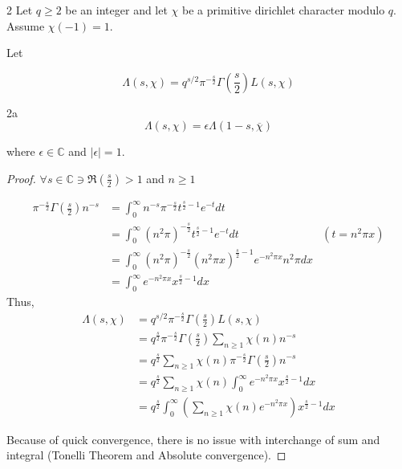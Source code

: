 \documentclass{article}
\newcommand{\C}{\mathbb{C}}
\newcommand{\abs}[1]{\left\lvert #1\right\rvert}
\begin{document}
\bigskip

\begin{PROB}{2}\label{Problem 2.}
    Let $q \geq 2$ be an integer and let $\chi$ be a primitive dirichlet character modulo $q$. Assume $\chi(-1) = 1$. 
    
    Let 

    \[\Lambda(s, \chi) = q^{s / 2} \pi^{-\frac{s}{2}}\Gamma\left(\frac{s}{2}\right)L(s, \chi)\]
\end{PROB}
\begin{claim}{2a}\label{Claim 2a.}
    \[\Lambda(s, \chi) = \epsilon \Lambda(1 - s, \overline{\chi})\]
    
    where $\epsilon \in \C$ and $\abs{\epsilon} = 1$.    
\end{claim}
\begin{proof}
    $\forall s \in \C \ni \Re(\frac{s}{2}) > 1$ and $n \geq 1$
    
    \begin{align*}
        \pi^{-\frac{s}{2}} \Gamma\left(\frac{s}{2}\right) n^{-s} &= \int_{0}^{\infty} n^{-s}\pi^{-\frac{s}{2}} t^{\frac{s}{2} - 1}e^{-t} dt \\
        &= \int_{0}^{\infty} (n^2 \pi)^{-\frac{s}{2}} t^{\frac{s}{2} - 1}e^{-t} dt & (t = n^2 \pi x) \\
        &= \int_0^{\infty} (n^2 \pi)^{-\frac{s}{2}} (n^2 \pi x)^{\frac{s}{2} - 1} e^{-n^2 \pi x} n^2 \pi dx \\
        &= \int_{0}^{\infty} e^{-n^2 \pi x} x^{\frac{s}{2} - 1} dx
    \end{align*}
    Thus, 
    \begin{align*}
        \Lambda(s, \chi) &= q^{s / 2} \pi^{-\frac{s}{2}}\Gamma\left(\frac{s}{2}\right)L(s, \chi) \\
        &= q^{\frac{s}{2}} \pi^{-\frac{s}{2}}\Gamma\left(\frac{s}{2}\right) \sum_{n \geq 1} \chi(n) n^{-s} \\
        &= q^{\frac{s}{2}} \sum_{n \geq 1} \chi(n) \pi^{-\frac{s}{2}}\Gamma\left(\frac{s}{2}\right) n^{-s} \\
        &=  q^{\frac{s}{2}} \sum_{n \geq 1} \chi(n) \int_0^\infty e^{-n^2 \pi x} x^{\frac{s}{2} - 1} dx \\
        &= q^{\frac{s}{2}} \int_0^\infty \left(\sum_{n \geq 1} \chi(n) e^{-n^2 \pi x}\right) x^{\frac{s}{2} - 1} dx 
    \end{align*}

    Because of quick convergence, there is no issue with interchange of sum and integral (Tonelli Theorem and Absolute convergence).  


\end{proof}
\end{document}
